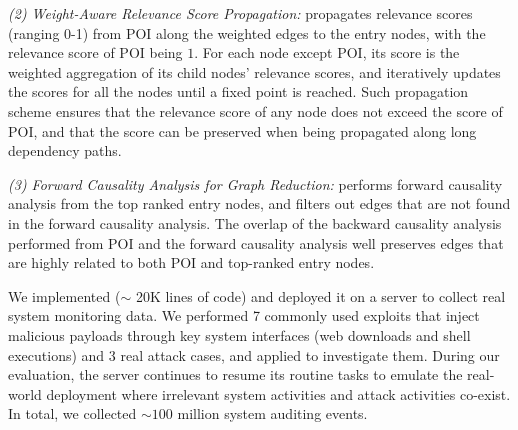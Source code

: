 \emph{(2) Weight-Aware Relevance Score Propagation:} 
\tool propagates relevance scores (ranging 0-1) from POI along the weighted edges to the entry nodes, with the relevance score of POI being $1$.
For each node except POI, its score is the weighted aggregation of its child nodes' relevance scores, and \tool iteratively updates the scores for all the nodes until a fixed point is reached.
Such propagation scheme ensures that the relevance score of any node does not exceed the score of POI, and that the score can be preserved when being propagated along long dependency paths.


\emph{(3) Forward Causality Analysis for Graph Reduction:} 
\tool performs forward causality analysis from the top ranked entry nodes, and filters out edges that are not found in the forward causality analysis. 
The overlap of the backward causality analysis performed from POI and the forward causality analysis well preserves edges that are highly related to both POI and top-ranked entry nodes.







We implemented \tool ($\sim$ 20K lines of code) and deployed it on a server to collect real system monitoring data.
We performed 7 commonly used exploits that inject malicious payloads through key system interfaces (\eg web downloads and shell executions)
and 3 real attack cases,
and applied \tool to investigate them.
%
During our evaluation, the server continues to resume its routine tasks to emulate the real-world deployment where irrelevant system activities and attack activities co-exist.
In total, we collected ${\sim}100$ million system auditing events.

